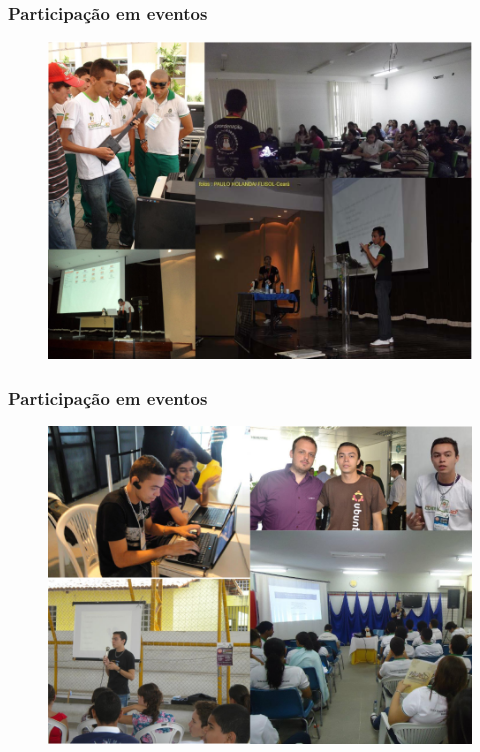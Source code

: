 \begin{frame}\frametitle{Participação em eventos}

\begin{figure}
   \includegraphics[scale=0.3]{img/wall-1.png}
\end{figure}

\end{frame}

\begin{frame}\frametitle{Participação em eventos}

\begin{figure}
   \includegraphics[scale=0.3]{img/wall-2.png}
\end{figure}

\end{frame}

